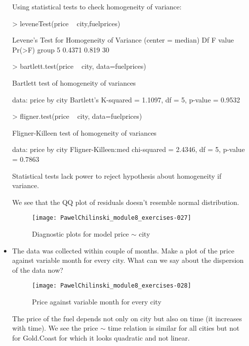 \documentclass[a4paper]{article}
\begin{document}
\begin{itemize}
Using statistical tests to check homogeneity of variance:
\begin{Schunk}
\begin{Sinput}
> leveneTest(price ~ city,fuelprices)	
\end{Sinput}
\begin{Soutput}
Levene's Test for Homogeneity of Variance (center = median)
      Df F value Pr(>F)
group  5  0.4371  0.819
      30               
\end{Soutput}
\begin{Sinput}
> bartlett.test(price ~ city, data=fuelprices)
\end{Sinput}
\begin{Soutput}
	Bartlett test of homogeneity of variances

data:  price by city
Bartlett's K-squared = 1.1097, df = 5, p-value = 0.9532
\end{Soutput}
\begin{Sinput}
> fligner.test(price ~ city, data=fuelprices)
\end{Sinput}
\begin{Soutput}
	Fligner-Killeen test of homogeneity of variances

data:  price by city
Fligner-Killeen:med chi-squared = 2.4346, df = 5, p-value = 0.7863
\end{Soutput}
\end{Schunk}
Statistical tests lack power to reject hypothesis about homogeneity if variance.

We see that the QQ plot of residuals doesn't resemble normal distribution.
\begin{figure}[H]
\begin{center}
\texttt{[image: PawelChilinski\_module8\_exercises-027]}
\caption{Diagnostic plots for model price $\sim$ city}
\end{center}
\end{figure}

\item The data was collected within couple of months. Make a plot of the price 
against variable month  for every city. What can we say about the dispersion of the data now?

\begin{figure}[H]
\begin{center}
\texttt{[image: PawelChilinski\_module8\_exercises-028]}
\caption{Price against variable month  for every city}
\label{PRICE_MONTH}
\end{center}
\end{figure}
The price of the fuel depends not only on city but also on time (it increases
with time). We see the price $\sim$ time relation is similar for all cities but
not for Gold.Coast for which it looks quadratic and not linear.


\end{itemize}
\end{document}
